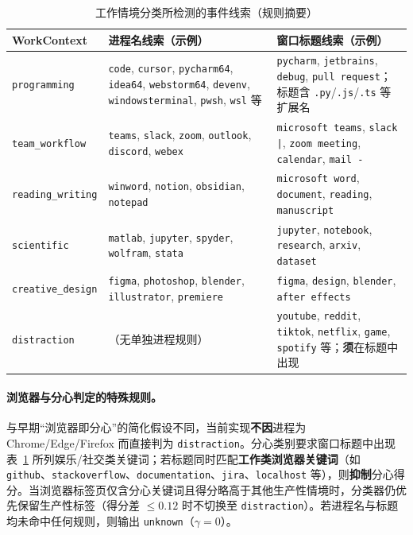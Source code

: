 \documentclass[12pt, fontset=windows]{ctexart}
\begin{document}
\begin{table}[H]
\centering
\caption{工作情境分类所检测的事件线索（规则摘要）}
\label{tab:context-detection}
\footnotesize
\begin{tabular}{@{}p{2.4cm}p{4.6cm}p{5.6cm}@{}}
\toprule
\textbf{WorkContext} & \textbf{进程名线索（示例）} & \textbf{窗口标题线索（示例）} \\
\midrule
\texttt{programming} &
\texttt{code}, \texttt{cursor}, \texttt{pycharm64}, \texttt{idea64}, \texttt{webstorm64}, \texttt{devenv}, \texttt{windowsterminal}, \texttt{pwsh}, \texttt{wsl} 等 &
\texttt{pycharm}, \texttt{jetbrains}, \texttt{debug}, \texttt{pull request}；标题含 \texttt{.py}/\texttt{.js}/\texttt{.ts} 等扩展名 \\
\texttt{team\_workflow} &
\texttt{teams}, \texttt{slack}, \texttt{zoom}, \texttt{outlook}, \texttt{discord}, \texttt{webex} &
\texttt{microsoft teams}, \texttt{slack |}, \texttt{zoom meeting}, \texttt{calendar}, \texttt{mail -} \\
\texttt{reading\_writing} &
\texttt{winword}, \texttt{notion}, \texttt{obsidian}, \texttt{notepad} &
\texttt{microsoft word}, \texttt{document}, \texttt{reading}, \texttt{manuscript} \\
\texttt{scientific} &
\texttt{matlab}, \texttt{jupyter}, \texttt{spyder}, \texttt{wolfram}, \texttt{stata} &
\texttt{jupyter}, \texttt{notebook}, \texttt{research}, \texttt{arxiv}, \texttt{dataset} \\
\texttt{creative\_design} &
\texttt{figma}, \texttt{photoshop}, \texttt{blender}, \texttt{illustrator}, \texttt{premiere} &
\texttt{figma}, \texttt{design}, \texttt{blender}, \texttt{after effects} \\
\texttt{distraction} &
（无单独进程规则） &
\texttt{youtube}, \texttt{reddit}, \texttt{tiktok}, \texttt{netflix}, \texttt{game}, \texttt{spotify} 等；\textbf{须}在标题中出现 \\
\bottomrule
\end{tabular}
\end{table}

\paragraph{浏览器与分心判定的特殊规则。}与早期“浏览器即分心”的简化假设不同，当前实现\textbf{不因}进程为 Chrome/Edge/Firefox 而直接判为 \texttt{distraction}。分心类别要求窗口标题中出现表~\ref{tab:context-detection} 所列娱乐/社交类关键词；若标题同时匹配\textbf{工作类浏览器关键词}（如 \texttt{github}、\texttt{stackoverflow}、\texttt{documentation}、\texttt{jira}、\texttt{localhost} 等），则\textbf{抑制}分心得分。当浏览器标签页仅含分心关键词且得分略高于其他生产性情境时，分类器仍优先保留生产性标签（得分差 $\le 0.12$ 时不切换至 \texttt{distraction}）。若进程名与标题均未命中任何规则，则输出 \texttt{unknown}（$\gamma=0$）。
\end{document}

